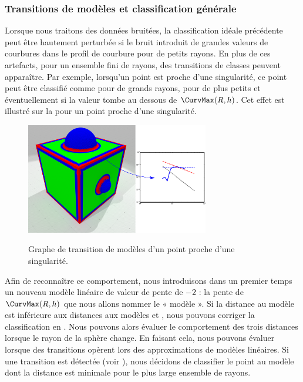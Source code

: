 \subsubsection{Transitions de modèles et classification générale}%
\label{sec:applications:feature:II:transitions}
%
Lorsque nous traitons des données bruitées, la classification idéale précédente
peut être hautement perturbée si le bruit introduit de grandes valeurs de
courbures dans le profil de courbure pour de petits rayons. En plus de ces
artefacts, pour un ensemble fini de rayons, des transitions de classes peuvent
apparaître. Par exemple, lorsqu'un point est proche d'une singularité, ce point
peut être classifié comme \featedge pour de grands rayons, \featsmooth pour de
plus petits et éventuellement \featflat si la valeur tombe au dessous de
$\CurvMax(R,h)$. Cet effet est illustré sur la  pour un
point proche d'une singularité.
%
\begin{figure}
\begin{center}
  {\includegraphics[width=8cm]{figures/CubeSpherePlot_transition}}
  \caption{Graphe de transition de modèles d'un point proche d'une singularité.}
  \label{fig:inversion}
\end{center}
\end{figure}
%
Afin de reconnaître ce comportement, nous introduisons dans un premier temps un
nouveau modèle linéaire de valeur de pente de $-2$ : la pente de $\CurvMax(R,h)$
que nous allons nommer le « modèle \featflat ». Si la distance au modèle
\featflat est inférieure aux distances aux modèles \featsmooth et \featedge,
nous pouvons corriger la classification en \featflat. Nous pouvons alors évaluer
le comportement des trois distances lorsque le rayon de la sphère change. En
faisant cela, nous pouvons évaluer lorsque des transitions opèrent lors des
approximations de modèles linéaires. Si une transition est détectée (voir
), nous décidons de classifier le point au modèle dont
la distance est minimale pour le plus large ensemble de rayons.
%
\\
